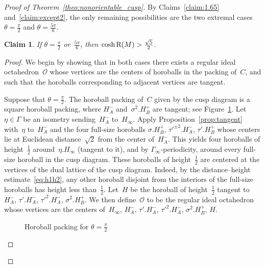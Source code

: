 \documentclass[11pt,reqno]{amsart}
\newtheorem{claim}[theorem]{Claim}
\theoremstyle{definition}
\numberwithin{equation}{section}
\newcommand\RR{{\rm R}}
\numberwithin{equation}{section}
\begin{document}
\begin{proof}[Proof of Theorem~\ref{theo:nonorientable_cusp}]
By Claims~\ref{claim:1.65} and~\ref{claim:except2}, the only remaining possibilities are the two extremal cases $\theta = \frac{\pi}{2}$ and $\theta = \frac{5\pi}{6}$.


\begin{claim}
If $\theta = \frac{\pi}{2}$ or~$\frac{5\pi}{6}$, then $\cosh \RR(M) > \frac{\sqrt{5}}{2}$.
\end{claim}

\begin{proof}
We begin by showing that in both cases there exists a regular ideal octahedron~$\mathcal{O}$ whose vertices are the centers of horoballs in the packing of~$C$, and such that the horoballs corresponding to adjacent vertices are tangent.

Suppose that $\theta=\frac{\pi}{2}$.
The horoball packing of~$C$ given by the cusp diagram is a square horoball packing, where $H_A^-$ and~$\sigma^2.H_B^+$ are tangent; see Figure~\ref{fig:pi/2}.
Let $\eta \in \Gamma$ be an isometry sending~$H_A^-$ to~$H_\infty$.
Apply Proposition~\ref{prop:tangent} with~$\eta$ to~$H_A^-$ and the four full-size horoballs $\sigma.H_B^+$, $\tau'^{\pm 2}.H_A^-$, $\tau'.H_B^+$ whose centers lie at Euclidean distance~$\sqrt{2}$ from the center of~$H_A^-$.
This yields four horoballs of height~$\frac{1}{2}$ around~$\eta.H_\infty$ (tangent to it), and by $\Gamma_\infty$-periodicity, around every full-size horoball in the cusp diagram.
These horoballs of height~$\frac{1}{2}$ are centered at the vertices of the dual lattice of the cusp diagram.
Indeed, by the distance--height estimate~\eqref{eq:h1h2}, any other horoball disjoint from the interiors of the full-size horoballs has height less than~$\frac{1}{2}$.
Let~$H$ be the horoball of height~$\frac{1}{2}$ tangent to~$H_A^-$, $\tau'.H_A^-$, $\tau'^2.H_A^-$, $\sigma^2.H_B^+$.
We then define~$\mathcal{O}$ to be the regular ideal octahedron whose vertices are the centers of~$H_\infty$, $H_A^-$, $\tau'.H_A^-$, $\tau'^2.H_A^-$, $\sigma^2.H_B^+$, $H$.

\medskip

\begin{figure}[htbp!]
\centering
\vspace*{4.2cm}
\hspace*{-0.5cm}
\def\svgwidth{0.35\textheight}

\vspace*{0cm}
\caption{Horoball packing for $\theta=\frac{\pi}{2}$} \label{fig:pi/2}
\end{figure}


\end{proof}
\end{proof}
\end{document}
